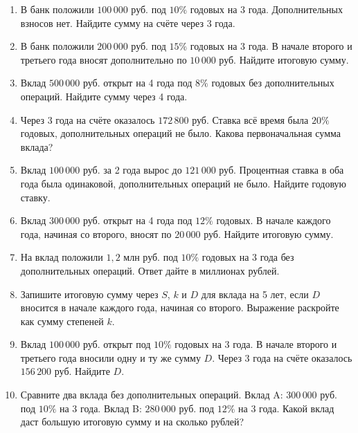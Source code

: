 \documentclass[a4paper,12pt]{article}
\begin{document}
\begin{enumerate}
  \item В банк положили $100\,000$ руб. под $10\%$ годовых на 3 года. Дополнительных взносов нет. Найдите сумму на счёте через 3 года.

  \item В банк положили $200\,000$ руб. под $15\%$ годовых на 3 года. В начале второго и третьего года вносят дополнительно по $10\,000$ руб. Найдите итоговую сумму.

  \item Вклад $500\,000$ руб. открыт на 4 года под $8\%$ годовых без дополнительных операций. Найдите сумму через 4 года.

  \item Через 3 года на счёте оказалось $172\,800$ руб. Ставка всё время была $20\%$ годовых, дополнительных операций не было. Какова первоначальная сумма вклада?

  \item Вклад $100\,000$ руб. за 2 года вырос до $121\,000$ руб. Процентная ставка в оба года была одинаковой, дополнительных операций не было. Найдите годовую ставку.

  \item Вклад $300\,000$ руб. открыт на 4 года под $12\%$ годовых. В начале каждого года, начиная со второго, вносят по $20\,000$ руб. Найдите итоговую сумму.

  \item На вклад положили $1{,}2$ млн руб. под $10\%$ годовых на 3 года без дополнительных операций. Ответ дайте в миллионах рублей.

  \item Запишите итоговую сумму через $S$, $k$ и $D$ для вклада на 5 лет, если $D$ вносится в начале каждого года, начиная со второго. Выражение раскройте как сумму степеней $k$.

  \item Вклад $100\,000$ руб. открыт под $10\%$ годовых на 3 года. В начале второго и третьего года вносили одну и ту же сумму $D$. Через 3 года на счёте оказалось $156\,200$ руб. Найдите $D$.

  \item Сравните два вклада без дополнительных операций. Вклад A: $300\,000$ руб. под $10\%$ на 3 года. Вклад B: $280\,000$ руб. под $12\%$ на 3 года. Какой вклад даст большую итоговую сумму и на сколько рублей?
\end{enumerate}

\clearpage
\end{document}
